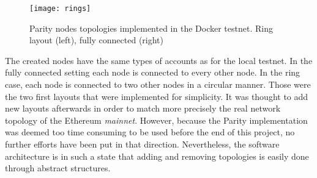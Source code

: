 \begin{figure}
	\centering
	\texttt{[image: rings]}
    \caption{Parity nodes topologies implemented in the Docker testnet. Ring
    layout (left), fully connected (right)}
	\label{fig:layout}
\end{figure}

The created nodes have the same types of accounts as for the local testnet.
In the fully connected setting each node is connected to every other node. In
the ring case, each node is connected to two other nodes in a circular manner.
Those were the two first layouts that were implemented for simplicity. It was
thought to add new layouts afterwards in order to match more precisely the real
network topology of the Ethereum \textit{mainnet}. However, because the Parity
implementation was deemed too time consuming to be used before the end of this
project, no further efforts have been put in that direction. Nevertheless, the
software architecture is in such a state that adding and removing topologies is
easily done through abstract structures.
